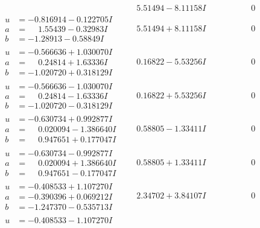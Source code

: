 \documentclass[1p]{elsarticle_modified}
\theoremstyle{definition}
\begin{document}
$$\begin{array}{c|c|c}
 & \phantom{-}5.51494 - 8.11158 I & \phantom{-0.000000 } 0 \\ \hline\begin{aligned}
u &= -0.816914 - 0.122705 I \\
a &= \phantom{-}1.55439 - 0.32983 I \\
b &= -1.28913 - 0.58849 I\end{aligned}
 & \phantom{-}5.51494 + 8.11158 I & \phantom{-0.000000 } 0 \\ \hline\begin{aligned}
u &= -0.566636 + 1.030070 I \\
a &= \phantom{-}0.24814 + 1.63336 I \\
b &= -1.020720 + 0.318129 I\end{aligned}
 & \phantom{-}0.16822 - 5.53256 I & \phantom{-0.000000 } 0 \\ \hline\begin{aligned}
u &= -0.566636 - 1.030070 I \\
a &= \phantom{-}0.24814 - 1.63336 I \\
b &= -1.020720 - 0.318129 I\end{aligned}
 & \phantom{-}0.16822 + 5.53256 I & \phantom{-0.000000 } 0 \\ \hline\begin{aligned}
u &= -0.630734 + 0.992877 I \\
a &= \phantom{-}0.020094 - 1.386640 I \\
b &= \phantom{-}0.947651 + 0.177047 I\end{aligned}
 & \phantom{-}0.58805 - 1.33411 I & \phantom{-0.000000 } 0 \\ \hline\begin{aligned}
u &= -0.630734 - 0.992877 I \\
a &= \phantom{-}0.020094 + 1.386640 I \\
b &= \phantom{-}0.947651 - 0.177047 I\end{aligned}
 & \phantom{-}0.58805 + 1.33411 I & \phantom{-0.000000 } 0 \\ \hline\begin{aligned}
u &= -0.408533 + 1.107270 I \\
a &= -0.390396 + 0.069212 I \\
b &= -1.247370 - 0.535713 I\end{aligned}
 & \phantom{-}2.34702 + 3.84107 I & \phantom{-0.000000 } 0 \\ \hline\begin{aligned}
u &= -0.408533 - 1.107270 I \\

\end{aligned}
\end{array}$$
\end{document}

